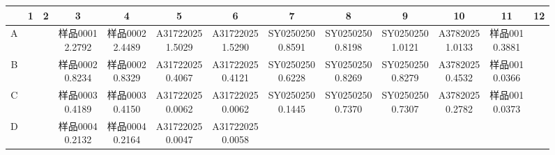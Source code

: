 \documentclass[UTF8,10pt,a4paper,fontset=fandol]{ctexart}
\begin{document}
\begin{center}
\scriptsize
\begin{tabular}{|c|c|c|c|c|c|c|c|c|c|c|c|c|}
\hline
 & 1 & 2 & 3 & 4 & 5 & 6 & 7 & 8 & 9 & 10 & 11 & 12\\
\hline
A & & & \shortstack{样品0001\\2.2792} & \shortstack{样品0002\\2.4489} &
\shortstack{A31722025\\1.5029} & \shortstack{A31722025\\1.5290} &
\shortstack{SY0250250\\0.8591} & \shortstack{SY0250250\\0.8198} &
\shortstack{SY0250250\\1.0121} & \shortstack{A3782025\\1.0133} &
\shortstack{样品001\\0.3881} & \\
\hline
B & & & \shortstack{样品0002\\0.8234} & \shortstack{样品0002\\0.8329} &
\shortstack{A31722025\\0.4067} & \shortstack{A31722025\\0.4121} &
\shortstack{SY0250250\\0.6228} & \shortstack{SY0250250\\0.8269} &
\shortstack{SY0250250\\0.8279} & \shortstack{A3782025\\0.4532} &
\shortstack{样品001\\0.0366} & \\
\hline
C & & & \shortstack{样品0003\\0.4189} & \shortstack{样品0003\\0.4150} &
\shortstack{A31722025\\0.0062} & \shortstack{A31722025\\0.0062} &
\shortstack{SY0250250\\0.1445} & \shortstack{SY0250250\\0.7370} &
\shortstack{SY0250250\\0.7307} & \shortstack{A3782025\\0.2782} &
\shortstack{样品001\\0.0373} & \\
\hline
D & & & \shortstack{样品0004\\0.2132} & \shortstack{样品0004\\0.2164} &
\shortstack{A31722025\\0.0047} & \shortstack{A31722025\\0.0058} &

\end{tabular}
\end{center}
\end{document}
